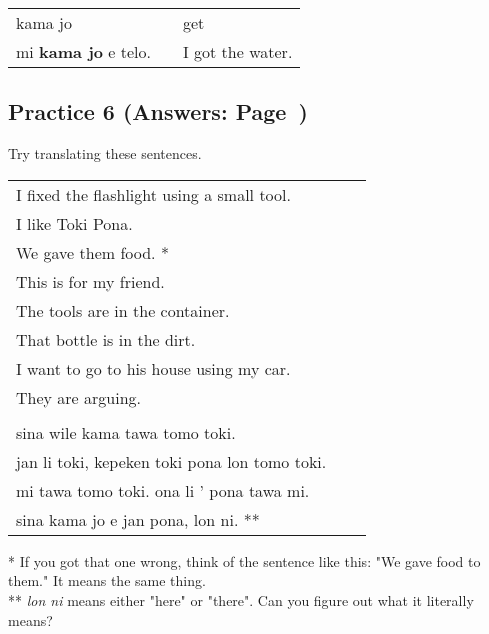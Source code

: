 \begin{supertabular}{p{5,5cm}|ll}
kama jo && get \\
mi \textbf{kama jo} e telo. && I got the water. \\
\end{supertabular} 
%
\subsection*{Practice 6 (Answers: Page~\pageref{'prepositions01'})}
%
Try translating these sentences. 

\begin{supertabular}{p{5,5cm}|ll}
I fixed the flashlight using a small tool.  &&  \\ %
I like Toki Pona.   &&   \\ %
We gave them food. * &&    \\ %
This is for my friend.   &&   \\ %
The tools are in the container.   &&   \\ %
That bottle is in the dirt.  &&    \\ %
I want to go to his house using my car.  &&   \\  %
They are arguing.   &&   \\ %
&& \\ %
sina wile kama tawa tomo toki.   &&   \\ %
jan li toki, kepeken toki pona lon tomo toki.  &&    \\ %
mi tawa tomo toki. ona li ' pona tawa mi.  &&   \\  %
sina kama jo e jan pona, lon ni. **  &&   \\ %
\end{supertabular} 

* If you got that one wrong, think of the sentence like this: 
"We gave food to them." It means the same thing. \\
** \textit{lon ni} means either "here" or "there". 
Can you figure out what it literally means? 
%
